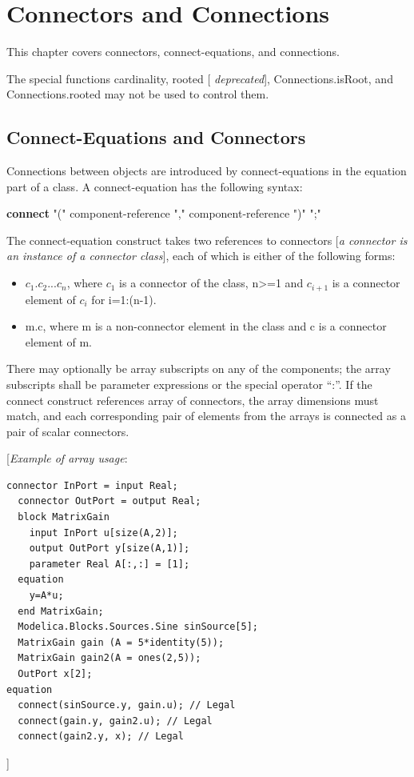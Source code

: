 \documentclass[10pt,a4paper]{report}
\def\doublelabel#1{\label{#1}\hypertarget{#1}{}}
\begin{document}
\chapter{Connectors and Connections}\doublelabel{connectors-and-connections}

This chapter covers connectors, connect-equations, and connections.

The special functions cardinality, rooted {[} \emph{deprecated}{]},
Connections.isRoot, and Connections.rooted may not be used to control
them.

\section{Connect-Equations and Connectors}\doublelabel{connect-equations-and-connectors}

Connections between objects are introduced by connect-equations in the
equation part of a class. A connect-equation has the following syntax:

\textbf{connect} "(" component-reference "," component-reference ")" ";"

The connect-equation construct takes two references to connectors
{[}\emph{a connector is an instance of a connector class}{]}, each of
which is either of the following forms:

\begin{itemize}
\item
  $c_1.c_2...c_n$,
  where $c_1$ is a connector of the class,
  n\textgreater{}=1 and $c_{i+1}$ is a connector element of
  $c_i$ for i=1:(n-1).
\end{itemize}

\begin{itemize}
\item
  m.c, where m is a non-connector element in the class and c is a
  connector element of m.
\end{itemize}

There may optionally be array subscripts on any of the components; the
array subscripts shall be parameter expressions or the special operator
``:''. If the connect construct references array of connectors, the
array dimensions must match, and each corresponding pair of elements
from the arrays is connected as a pair of scalar connectors.

{[}\emph{Example of array usage}:

\begin{lstlisting}[language=modelica]
  connector InPort = input Real;
  connector OutPort = output Real;
  block MatrixGain
    input InPort u[size(A,2)];
    output OutPort y[size(A,1)];
    parameter Real A[:,:] = [1];
  equation
    y=A*u;
  end MatrixGain;
  Modelica.Blocks.Sources.Sine sinSource[5];
  MatrixGain gain (A = 5*identity(5));
  MatrixGain gain2(A = ones(2,5));
  OutPort x[2];
equation
  connect(sinSource.y, gain.u); // Legal
  connect(gain.y, gain2.u); // Legal
  connect(gain2.y, x); // Legal
\end{lstlisting}
{]}
\end{document}

